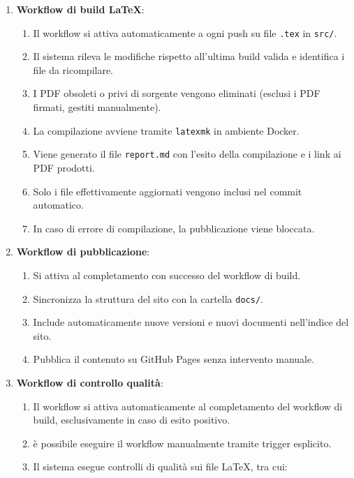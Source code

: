 \documentclass[a4paper, 11pt, oneside]{scrartcl}
\begin{document}
\begin{enumerate}
    \item \textbf{Workflow di build \LaTeX{}}:
          \begin{enumerate}[label=\alph*.]
              \item Il workflow si attiva automaticamente a ogni push su file \texttt{.tex} in \texttt{src/}.
              \item Il sistema rileva le modifiche rispetto all'ultima build valida e identifica i file da ricompilare.
              \item I PDF obsoleti o privi di sorgente vengono eliminati (esclusi i PDF firmati, gestiti manualmente).
              \item La compilazione avviene tramite \texttt{latexmk} in ambiente Docker{\scriptsize{}}.
              \item Viene generato il file \texttt{report.md} con l'esito della compilazione e i link ai PDF prodotti.
              \item Solo i file effettivamente aggiornati vengono inclusi nel commit automatico.
              \item In caso di errore di compilazione, la pubblicazione viene bloccata.
          \end{enumerate}
    \item \textbf{Workflow di pubblicazione}:
          \begin{enumerate}[label=\alph*.]
              \item Si attiva al completamento con successo del workflow di build.
              \item Sincronizza la struttura del sito con la cartella \texttt{docs/}.
              \item Include automaticamente nuove versioni e nuovi documenti nell'indice del sito.
              \item Pubblica il contenuto su GitHub Pages senza intervento manuale.
          \end{enumerate}
    \item \textbf{Workflow di controllo qualità}:
          \begin{enumerate}[label=\alph*.]
              \item Il workflow si attiva automaticamente al completamento del workflow di build, esclusivamente in caso di esito positivo.
              \item è possibile eseguire il workflow manualmente tramite trigger esplicito.
              \item Il sistema esegue controlli di qualità sui file \LaTeX{}, tra cui:

\end{enumerate}
\end{enumerate}
\end{document}
